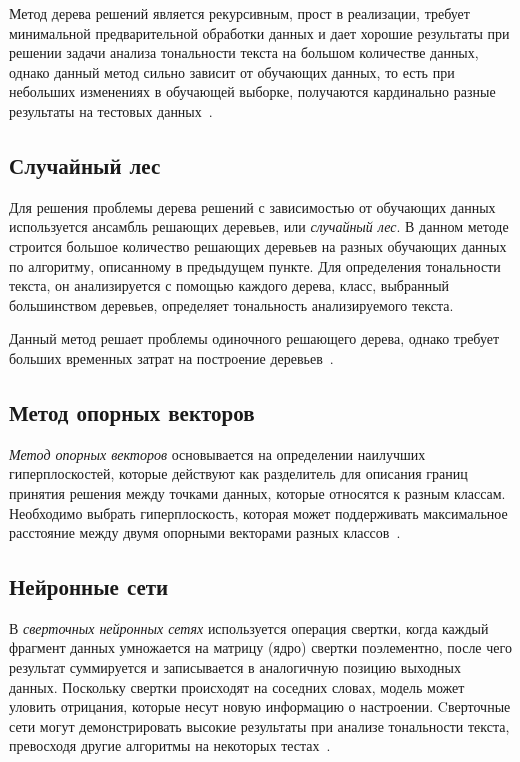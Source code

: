 Метод дерева решений является рекурсивным, прост в реализации, требует
минимальной предварительной обработки данных и дает хорошие результаты при
решении задачи анализа тональности текста на большом количестве данных, однако
данный метод сильно зависит от обучающих данных, то есть при небольших
изменениях в обучающей выборке, получаются кардинально разные результаты на
тестовых данных~\cite{article9}.

\subsection{Случайный лес}

Для решения проблемы дерева решений с зависимостью от обучающих данных
используется ансамбль решающих деревьев, или \textit{случайный лес}.
В данном методе строится большое количество решающих деревьев на разных
обучающих данных по алгоритму, описанному в предыдущем пункте. Для определения
тональности текста, он анализируется с помощью каждого дерева, класс, выбранный
большинством деревьев, определяет тональность анализируемого текста.

Данный метод решает проблемы одиночного решающего дерева, однако требует больших
временных затрат на построение деревьев~\cite{article9}.

\subsection{Метод опорных векторов}

\textit{Метод опорных векторов} основывается на определении наилучших
гиперплоскостей, которые действуют как разделитель для описания границ принятия
решения между точками данных, которые относятся к разным классам. Необходимо
выбрать гиперплоскость, которая может поддерживать максимальное расстояние между
двумя опорными векторами разных классов~\cite{article16}.

\subsection{Нейронные сети}

В \textit{сверточных нейронных сетях} используется операция свертки, когда
каждый фрагмент данных умножается на матрицу (ядро) свертки поэлементно, после
чего результат суммируется и записывается в аналогичную позицию выходных данных.
Поскольку свертки происходят на соседних словах, модель может уловить отрицания,
которые несут новую информацию о настроении. Cверточные сети могут
демонстрировать высокие результаты при анализе тональности текста, превосходя
другие алгоритмы на некоторых тестах~\cite{article9}.

